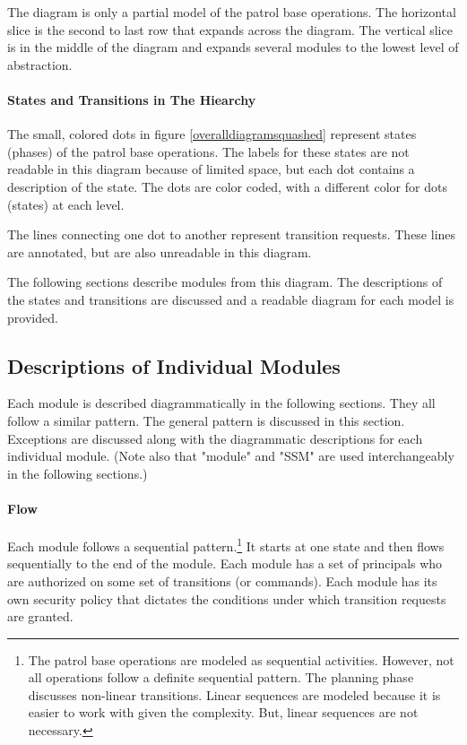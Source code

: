 \documentclass[../../main/main.tex]{subfiles}
\begin{document}
The diagram is only a partial model of the patrol base operations.  The horizontal slice is the second to last row that expands across the diagram.  The vertical slice is in the middle of the diagram and expands several modules to the lowest level of abstraction.  

\paragraph*{States and Transitions in The Hiearchy}
The small, colored dots in figure \ref{overalldiagramsquashed} represent states (phases) of the patrol base operations.   The labels for these states are not readable in this diagram because of limited space, but each dot contains a description of the state.  The dots are color coded, with a different color for dots (states) at each level. 

The lines connecting one dot to another represent transition requests.  These lines are annotated, but are also unreadable in this diagram. 

The following sections describe modules from this diagram.  The descriptions of the states and transitions are discussed and a readable diagram for each model is provided.  


\subsection{Descriptions of Individual Modules}
Each module is described diagrammatically in the following sections.  They all follow a similar pattern.  The general pattern is discussed in this section.  Exceptions are discussed along with the diagrammatic descriptions for each individual module. (Note also that "module" and "SSM" are used interchangeably in the following sections.)

\paragraph*{Flow}
Each module follows a sequential pattern.\footnote{The patrol base operations are modeled as sequential activities.  However, not all operations follow a definite sequential pattern.  The planning phase discusses non-linear transitions.  Linear sequences are modeled because it is easier to work with given the complexity.  But, linear sequences are not necessary.}  It starts at one state and then flows sequentially to the end of the module. Each module has a set of principals who are authorized on some set of transitions (or commands).  Each module has its own security policy that dictates the conditions under which transition requests are granted.  
\end{document}
